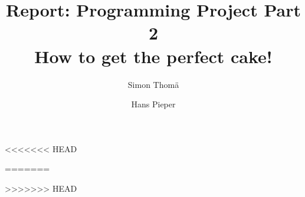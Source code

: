 \documentclass{article}
\author{Simon Thomä \and Hans Pieper}
\title{Report: Programming Project Part 2\\
		\large %
		How to get the perfect cake!
		}
\begin{document}
\maketitle




<<<<<<< HEAD

=======


>>>>>>> HEAD



{}
\end{document}
